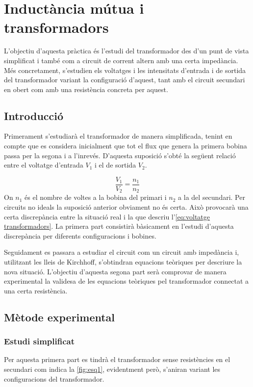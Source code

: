 \chapter{Inductància mútua i transformadors}

\begin{resum}
L'objectiu d'aquesta pràctica és l'estudi del transformador des d'un punt de vista simplificat i també com a circuit de corrent altern amb una certa impedància. Més concretament, s'estudien els voltatges i les intensitats d'entrada i de sortida del transformador variant la configuració d'aquest, tant amb el circuit secundari en obert com amb una resistència concreta per aquest.
\end{resum}

\section{Introducció}\label{sec:introducció}

Primerament s'estudiarà el transformador de manera simplificada, tenint en compte que es considera inicialment que tot el flux que genera la primera bobina passa per la segona i a l'inrevés. D'aquesta suposició s'obté la següent relació entre el voltatge d'entrada $V_1$ i el de sortida $V_2$. 

\begin{equation}\label{eq:voltatge transformadors}
    \frac{V_1}{V_2}=\frac{n_1}{n_2}
\end{equation}
On $n_1$ és el nombre de voltes a la bobina del primari i $n_2$ a la del secundari. Per circuits no ideals la suposició anterior obviament no és certa. Això provocarà una certa discrepància entre la situació real i la que descriu l'\cref{eq:voltatge transformadors}. La primera part consistirà bàsicament en l'estudi d'aquesta discrepància per diferents configuracions i bobines.

Seguidament es passara a estudiar el circuit com un circuit amb impedància i, utilitzant les lleis de Kirchhoff, s'obtindran equacions teòriques per descriure la nova situació. L'objectiu d'aquesta segona part serà comprovar de manera experimental la validesa de les equacions teòriques pel transformador connectat a una certa resistència.

\section{Mètode experimental}\label{sec:met}
\subsection{Estudi simplificat}
Per aquesta primera part es tindrà el transformador sense resistències en el secundari com indica la \cref{fig:esq1}, evidentment però, s'aniran variant les configuracions del transformador.

